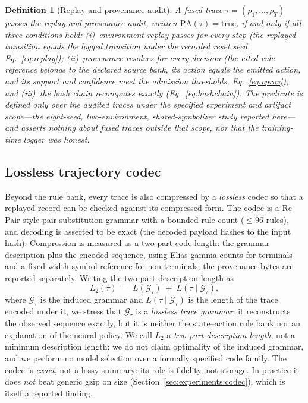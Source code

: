 \documentclass[11pt]{article}
\newtheorem{definition}{Definition}
\begin{document}
\begin{definition}[Replay-and-provenance audit]
\label{def:audit}
A fused trace $\tau=(\rho_1,\ldots,\rho_T)$ \emph{passes} the replay-and-provenance audit,
written $\mathrm{PA}(\tau)=\mathrm{true}$, if and only if all three conditions hold:
\emph{(i)~environment replay passes} for every step (the replayed transition equals the logged
transition under the recorded reset seed, Eq.~\ref{eq:replay}); \emph{(ii)~provenance resolves}
for every decision (the cited rule reference belongs to the declared source bank, its action equals
the emitted action, and its support and confidence meet the admission thresholds, Eq.~\ref{eq:vprov});
and \emph{(iii)~the hash chain recomputes} exactly (Eq.~\ref{eq:hashchain}). The predicate is defined
only over the audited traces under the specified experiment and artifact scope---the eight-seed,
two-environment, shared-symbolizer study reported here---and asserts nothing about fused traces
outside that scope, nor that the training-time logger was honest.
\end{definition}

\subsection{Lossless trajectory codec}
\label{sec:method:codec}

Beyond the rule bank, every trace is also compressed by a \emph{lossless} codec so that a replayed
record can be checked against its compressed form. The codec is a Re-Pair-style pair-substitution
grammar with a bounded rule count ($\le 96$ rules), and decoding is asserted to be exact (the decoded
payload hashes to the input hash). Compression is measured as a two-part code length: the grammar
description plus the encoded sequence, using Elias-gamma counts for terminals and a fixed-width symbol
reference for non-terminals; the provenance bytes are reported separately. Writing the two-part
description length as
\begin{equation}
L_2(\tau) \;=\; L(\mathcal{G}_\tau) \;+\; L(\tau \mid \mathcal{G}_\tau),
\label{eq:twopart_code}
\end{equation}
where $\mathcal{G}_\tau$ is the induced grammar and $L(\tau\mid\mathcal{G}_\tau)$ is the length of the
trace encoded under it, we stress that $\mathcal{G}_\tau$ is a \emph{lossless trace grammar}: it
reconstructs the observed sequence exactly, but it is neither the state--action rule bank nor an
explanation of the neural policy. We call $L_2$ a \emph{two-part description length}, not a minimum
description length: we do not claim optimality of the induced grammar, and we perform no model
selection over a formally specified code family. The codec is \emph{exact},
not a lossy summary: its role is fidelity, not storage. In practice it does \emph{not} beat generic
gzip on size (Section~\ref{sec:experiments:codec}), which is itself a reported finding.
\end{document}
